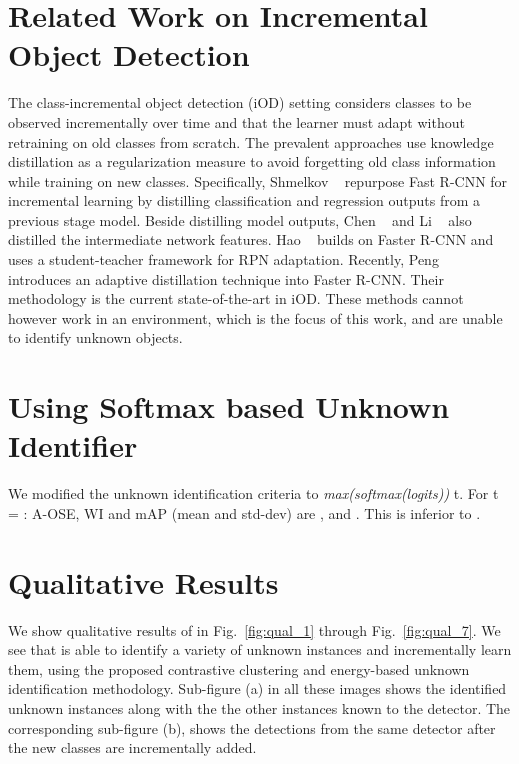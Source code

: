 \documentclass[final]{cvpr}
\begin{document}
\section{Related Work on Incremental Object Detection} 
The class-incremental object detection (iOD) setting considers classes to be observed incrementally over time and that the learner must adapt without retraining on old classes from scratch. The prevalent approaches \cite{shmelkov2017incremental,li2019rilod,hao2019end,chen2019new} use knowledge distillation \cite{hinton2015distilling}  as a regularization measure to avoid forgetting old class information while training on new classes. Specifically, Shmelkov \etal~\cite{shmelkov2017incremental} repurpose Fast R-CNN for incremental learning by distilling classification and regression outputs from a previous stage model. Beside distilling model outputs, Chen \etal~\cite{chen2019new} and Li \etal~\cite{li2019rilod} also distilled the intermediate network features. Hao \etal~\cite{hao2019end} builds on Faster R-CNN and uses a student-teacher framework for RPN adaptation. Recently, Peng \etal~\cite{PENG2020109} introduces an adaptive distillation technique into Faster R-CNN. Their methodology is the current state-of-the-art in iOD.
These methods cannot however work in an \OW environment, which is the focus of this work, and are unable to identify unknown objects. 



\section{Using Softmax based Unknown Identifier} We modified the unknown identification criteria to \textit{max(softmax(logits)) } t. For t = : A-OSE, WI and mAP (mean and std-dev) are ,  and . This is inferior to \method.

\section{Qualitative Results}
We show qualitative results of \method in Fig.~\ref{fig:qual_1} through Fig.~\ref{fig:qual_7}. We see that \method is able to identify a variety of unknown instances and incrementally learn them, using the proposed contrastive clustering and energy-based unknown identification methodology. Sub-figure (a) in all these images shows the identified unknown instances along with the the other instances known to the detector. The corresponding sub-figure (b), shows the detections from the same detector after the new classes are incrementally added.
\end{document}
